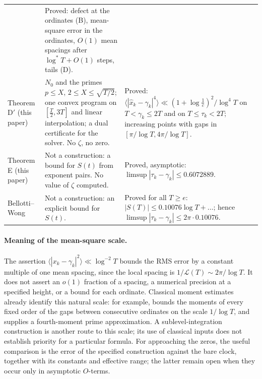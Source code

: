 \documentclass[preprint,12pt]{elsarticle}
\numberwithin{equation}{section}
\theoremstyle{plain}
\theoremstyle{definition}
\theoremstyle{remark}
\newcommand{\NO}{N_0}
\newcommand{\lL}{\mathcal L}
\begin{document}
\begin{longtable}{@{}p{}p{}p{}@{}}
& Proved: defect at the ordinates (B), mean-square error in the ordinates, $O(1)$ mean spacings after $\log^*T+O(1)$ steps, tails (D).\\
Theorem D$'$ (this paper)
& $\NO$ and the primes $p\le X$, $2\le X\le\sqrt{T/2}$; one convex program on $[\frac T2,3T]$ and linear interpolation; a dual certificate for the solver. No $\zeta$, no zero.
& Proved: $\langle|\widehat x_k-\gamma_k|^4\rangle\ll(1+\log\frac1c)^2/\log^4T$ on $T<\gamma_k\le2T$ and on $T\le\tau_k<2T$; increasing points with gaps in $[\pi/\log T,4\pi/\log T]$.\\
Theorem E (this paper)
& Not a construction: a bound for $S(t)$ from exponent pairs. No value of $\zeta$ computed.
& Proved, asymptotic: $\limsup|\tau_k-\gamma_k|\le0.6072889$.\\
Bellotti--Wong \cite{BellottiWong2025}
& Not a construction: an explicit bound for $S(t)$.
& Proved for all $T\ge e$: $|S(T)|\le0.10076\log T+\ldots$; hence $\limsup|\tau_k-\gamma_k|\le2\pi\cdot0.10076$.\\
\end{longtable}
\endgroup

\paragraph{Meaning of the mean-square scale.}\label{par:meansquare_scope}
The assertion $\langle|x_k-\gamma_k|^2\rangle\ll\log^{-2}T$ bounds the RMS error by a constant multiple of one mean spacing, since the local spacing is $1/\lL(T)\sim2\pi/\log T$. It does not assert an $o(1)$ fraction of a spacing, a numerical precision at a specified height, or a bound for each ordinate. Classical moment estimates already identify this natural scale: for example, \cite[\S9.25, (9.25.4)]{Titchmarsh1986} bounds the moments of every fixed order of the gaps between consecutive ordinates on the scale $1/\log T$, and \cite[(3.6)]{FazzariGerspachMinelli2025} supplies a fourth-moment prime approximation. A sublevel-integration construction is another route to this scale; its use of classical inputs does not establish priority for a particular formula. For approaching the zeros, the useful comparison is the error of the specified construction against the bare clock, together with its constants and effective range; the latter remain open when they occur only in asymptotic $O$-terms.
\end{document}
